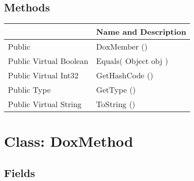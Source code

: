 \documentclass[11pt, oneside, a4paper]{book}
\begin{document}
\subsection{Methods}
\begin{center}
\begin{tabular}{| p{3cm} | p{12cm} | }
\hline
\textbf{ } & \textbf{ Name and Description}\\
\hline
 Public  &  DoxMember ()\hypertarget{SoftwareEngineeringTools.{}Documentation.{}DoxMember.{}DoxMember}{}\\
\hline
 Public  Virtual  Boolean &  Equals(\hypertarget{SoftwareEngineeringTools.{}Documentation.{}DoxMember.{}Equals\_Object}{} Object  obj  )\\
\hline
 Public  Virtual  Int32 &  GetHashCode ()\hypertarget{SoftwareEngineeringTools.{}Documentation.{}DoxMember.{}GetHashCode}{}\\
\hline
 Public  Type &  GetType ()\hypertarget{SoftwareEngineeringTools.{}Documentation.{}DoxMember.{}GetType}{}\\
\hline
 Public  Virtual  String &  ToString ()\hypertarget{SoftwareEngineeringTools.{}Documentation.{}DoxMember.{}ToString}{}\\
\hline
\end{tabular}
\end{center}
 


\hypertarget{SoftwareEngineeringTools.{}Documentation.{}DoxMethod}{}
\section{Class: DoxMethod}

\subsection{Fields}
\end{document}
